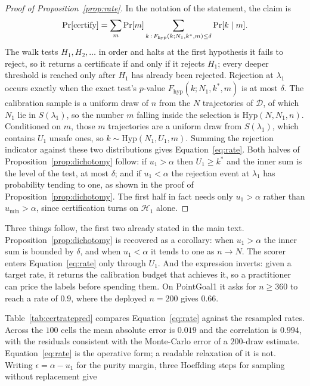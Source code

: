 \documentclass{article} %
\newcommand{\Doff}{\mathcal{D}}
\begin{document}
\begin{proof}[Proof of Proposition~\ref{prop:rate}]
In the notation of the statement, the claim is
\begin{equation}
\label{eq:rate}
\Pr[\textnormal{certify}]
 = \sum_{m} \Pr[m] \sum_{k \,:\, F_{\mathrm{hyp}}(k; N_1, k^{*}, m) \le \delta} \Pr[k \mid m].
\end{equation}
The walk tests $H_1, H_2, \dots$ in order and halts at the first hypothesis it fails to
reject, so it returns a certificate if and only if it rejects $H_1$; every deeper
threshold is reached only after $H_1$ has already been rejected. Rejection at
$\lambda_1$ occurs exactly when the exact test's $p$-value $F_{\mathrm{hyp}}(k; N_1, k^{*}, m)$ is at
most $\delta$. The calibration sample is a uniform draw of $n$ from the $N$
trajectories of $\Doff$, of which $N_1$ lie in $S(\lambda_1)$, so the number $m$ falling
inside the selection is $\mathrm{Hyp}(N, N_1, n)$. Conditioned on $m$, those $m$
trajectories are a uniform draw from $S(\lambda_1)$, which contains $U_1$ unsafe ones,
so $k \sim \mathrm{Hyp}(N_1, U_1, m)$. Summing the rejection indicator against
these two distributions gives Equation~\ref{eq:rate}. Both halves of
Proposition~\ref{prop:dichotomy} follow: if $u_1 > \alpha$ then $U_1 \ge k^{*}$ and the
inner sum is the level of the test, at most $\delta$; and if $u_1 < \alpha$ the rejection
event at $\lambda_1$ has probability tending to one, as shown in the proof of
Proposition~\ref{prop:dichotomy}. The first half in fact needs only $u_1 > \alpha$ rather
than $u_{\min} > \alpha$, since certification turns on $\mathcal{H}_1$ alone.
\end{proof}

Three things follow, the first two already stated in the main text. Proposition~\ref{prop:dichotomy} is recovered as a corollary: when
$u_1 > \alpha$ the inner sum is bounded by $\delta$, and when $u_1 < \alpha$ it tends to
one as $n \to N$. The scorer enters Equation~\ref{eq:rate} only through $U_1$. And the expression inverts: given a target rate, it returns the
calibration budget that achieves it, so a practitioner can price the labels before
spending them. On PointGoal1 it asks for $n \ge 360$ to reach a rate of $0.9$, where the
deployed $n = 200$ gives $0.66$.

Table~\ref{tab:certratepred} compares Equation~\ref{eq:rate} against the resampled
rates. Across the $100$ cells the mean absolute error is $0.019$ and the correlation is
$0.994$, with the residuals consistent with the Monte-Carlo error of a $200$-draw
estimate. Equation~\ref{eq:rate} is the operative form; a readable relaxation of it is not.
Writing $\epsilon = \alpha - u_1$ for the purity margin, three Hoeffding steps for
sampling without replacement give
\end{document}
